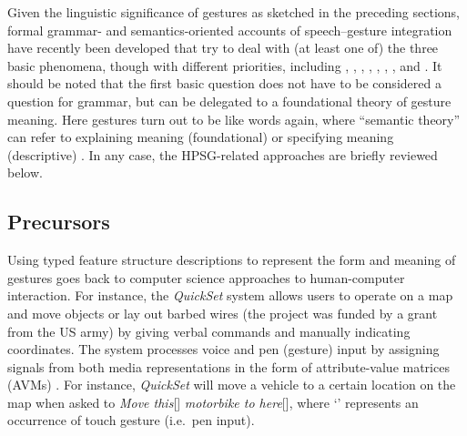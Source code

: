 \documentclass[output=paper
 	        ,biblatex
                ,babelshorthands
                ,newtxmath
                ,draftmode
                ,colorlinks, citecolor=brown
]{langscibook}
\begin{document}
Given the linguistic significance of gestures as sketched in the preceding sections, formal grammar- and semantics-oriented accounts of speech--gesture integration have recently been developed that try to deal with (at least one of) the three basic phenomena, though with different priorities, including
%
\citet{Alahverdzhieva:2013}, 
%
\citet{Alahverdzhieva:Lascarides:2010},
%
\cite{Ebert:2014:a},
%
\citet{Giorgolo:2010},
%
\citet{Giorgolo:Asudeh:2011},
%
\citet{Luecking:2013:a,Luecking:2016},
%
\citet{Rieser:2008,Rieser:2011,Rieser:2015},
%
\citet{Rieser:Poesio:2009} and
%
\citet{Schlenker:2018}.
%
It should be noted that the first basic question does not have to be considered a question for grammar, but can be delegated to a foundational theory of gesture meaning.
%
Here gestures turn out to be like words again, where \enquote{semantic theory} can refer to explaining meaning (foundational) or specifying meaning (descriptive) \citep[]{Lewis:1970}.
%
In any case, the HPSG-related approaches are briefly reviewed below.
%



\subsection{Precursors} 
\label{sec:precursors}

Using typed feature structure descriptions to represent the form and meaning of gestures goes back to computer science approaches to human-computer interaction. %
%
For instance, the \textit{QuickSet} system \citep{Cohen:et:al:1997} allows users to operate on a map and move objects or lay out barbed wires (the project was funded by a grant from the US army) by giving verbal commands and manually indicating coordinates.
%
The system processes voice and pen (gesture) input by assigning signals from both media representations in the form of attribute-value matrices (AVMs) \citep{Johnston:1998,Johnston:et:al:1997}.
%
For instance, \textit{QuickSet} will move a vehicle to a certain location on the map when asked to \emph{Move this}[\Pointing] \emph{motorbike to here}[\Pointing], where \enquote*{\Pointing} represents an occurrence of touch gesture (i.e.\ pen input). 
\end{document}
